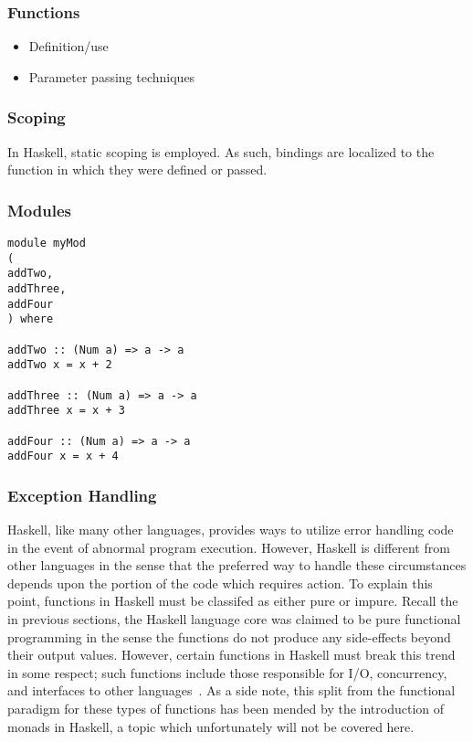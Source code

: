 \documentclass[titlepage,12pt]{article}
\newcommand{\bi}{\begin{itemize}}
\newcommand{\ei}{\end{itemize}}
\begin{document}
\subsubsection{Functions}
\bi
    \item Definition/use
    \item Parameter passing techniques
\ei

\subsubsection{Scoping}
In Haskell, static scoping is employed.  As such, bindings are localized
to the function in which they were defined or passed.

\subsubsection{Modules}
\begin{verbatim}
module myMod 
( 
addTwo,
addThree,
addFour
) where

addTwo :: (Num a) => a -> a
addTwo x = x + 2

addThree :: (Num a) => a -> a
addThree x = x + 3

addFour :: (Num a) => a -> a
addFour x = x + 4
\end{verbatim}
\subsubsection{Exception Handling}

Haskell, like many other languages, provides ways to utilize error handling code
in the event of abnormal program execution.  However, Haskell is
different from other languages in the sense that the preferred way to handle
these circumstances depends upon the portion of the code which requires action.
To explain this point, functions in Haskell must be classifed as either pure
or impure.  Recall the in previous sections, the Haskell language core was
claimed to be pure functional programming in the sense the functions do
not produce any side-effects beyond their output values.  However, certain
functions in Haskell must break this trend in some respect; such functions include
those responsible for I/O, concurrency, and interfaces to other languages~\cite{haskell-awkward-squad}.
As a side note, this split from the functional paradigm for these types of functions has
been mended by the introduction of monads in Haskell, a topic which unfortunately will not be covered here.
\end{document}
